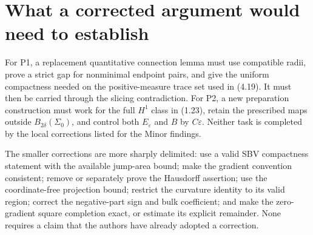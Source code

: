 \documentclass[10pt]{article}
\begin{document}
\section*{What a corrected argument would need to establish}
For P1, a replacement quantitative connection lemma must use compatible radii, prove a strict gap for nonminimal endpoint pairs, and give the uniform compactness needed on the positive-measure trace set used in (4.19). It must then be carried through the slicing contradiction. For P2, a new preparation construction must work for the full \(H^1\) class in (1.23), retain the prescribed maps outside \(B_{2\delta}(\Sigma_0)\), and control both \(E_\varepsilon\) and \(B\) by \(C\varepsilon\). Neither task is completed by the local corrections listed for the Minor findings.\par
The smaller corrections are more sharply delimited: use a valid SBV compactness statement with the available jump-area bound; make the gradient convention consistent; remove or separately prove the Hausdorff assertion; use the coordinate-free projection bound; restrict the curvature identity to its valid region; correct the negative-part sign and bulk coefficient; and make the zero-gradient square completion exact, or estimate its explicit remainder. None requires a claim that the authors have already adopted a correction.\par
\end{document}
